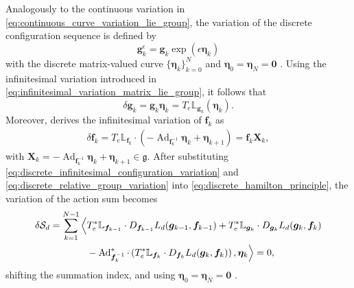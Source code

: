 Analogously to the continuous variation in \eqref{eq:continuous_curve_variation_lie_group}, 
the variation of the discrete configuration sequence is defined by
\begin{equation}
    \bm{g}_k^{\epsilon}
    =
    \bm{g}_k\exp(\epsilon\bm{\eta}_k)
    \label{eq:discrete_configuration_variation}
\end{equation}
with the discrete matrix-valued curve $\{\bm{\eta}_k \}^N_{k=0}$ and $\bm{\eta}_0=\bm{\eta}_N=\bm{0}$ \cite{Lee2008}.
Using the infinitesimal variation introduced 
in \eqref{eq:infinitesimal_variation_matrix_lie_group}, it follows that
\begin{equation}
    \delta\bm{g}_k=\bm{g}_k\bm{\eta}_k=T_e\mathbb{L}_{\bm{g}_k}(\bm{\eta}_k).
    \label{eq:discrete_infinitesimal_configuration_variation}
\end{equation}
Moreover, \cite{Lee2008} derives the infinitesimal variation of $\bm{f}_k$ as
\begin{align}
    \delta\bm{f}_k
    =
    T_e\mathbb{L}_{\bm{f}_k} \cdot \left(
        -\operatorname{Ad}_{\bm{f}_k^{-1}}\bm{\eta}_k+\bm{\eta}_{k+1}
    \right)
    =\bm{f}_k\bm{X}_k,
    \label{eq:discrete_relative_group_variation}
\end{align}
with $\bm{X}_k = -\operatorname{Ad}_{\bm{f}_k^{-1}}\bm{\eta}_k+\bm{\eta}_{k+1} \in\mathfrak g$.
After substituting \eqref{eq:discrete_infinitesimal_configuration_variation} and 
\eqref{eq:discrete_relative_group_variation} into \eqref{eq:discrete_hamilton_principle},
the variation of the action sum becomes 
\begin{align}
    \delta\mathcal S_d
    =
    \sum_{k=1}^{N-1}
    \Big\langle
        &T_e^*\mathbb{L}_{\bm{f}_{k-1}} \cdot D_{\bm{f}_{k-1}}L_d(\bm{g}_{k-1},\bm{f}_{k-1})
        +T_e^*\mathbb{L}_{\bm{g}_k} \cdot D_{\bm{g}_k}L_d(\bm{g}_k,\bm{f}_k)
        \notag\\
        &-
        \operatorname{Ad}_{\bm{f}_k^{-1}}^* \cdot
        \left(T_e^*\mathbb{L}_{\bm{f}_k} \cdot D_{\bm{f}_k}L_d(\bm{g}_k,\bm{f}_k)\right),
        \bm{\eta}_k
    \Big\rangle
    =0,
    \label{eq:variation_discrete_action_sum}
\end{align}
shifting the summation index, and using $\bm{\eta}_0=\bm{\eta}_N=\bm{0}$ \cite{Lee2008}.


